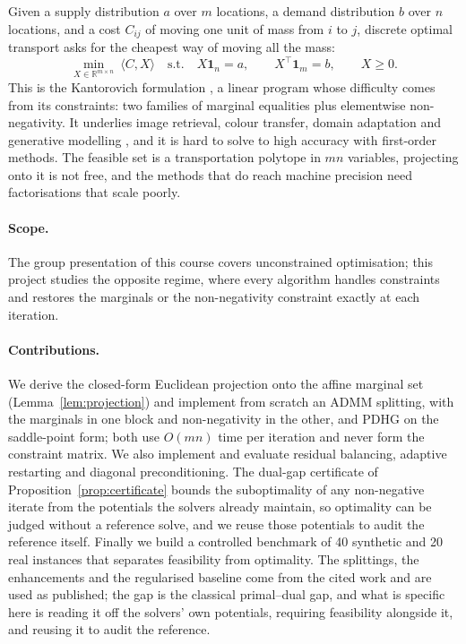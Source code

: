 \documentclass{article}
\newcommand{\R}{\mathbb{R}}
\begin{document}
Given a supply distribution $a$ over $m$ locations, a demand distribution $b$ over
$n$ locations, and a cost $C_{ij}$ of moving one unit of mass from $i$ to $j$,
discrete optimal transport asks for the cheapest way of moving all the mass:
\begin{equation}
\label{eq:ot}
\min_{X\in\R^{m\times n}}\ \langle C,X\rangle
\quad\text{s.t.}\quad
X\mathbf 1_n=a,\qquad X^\top\mathbf 1_m=b,\qquad X\ge 0 .
\end{equation}
This is the Kantorovich formulation \citep{kantorovich1942}, a linear program whose
difficulty comes from its constraints: two families of marginal equalities plus
elementwise non-negativity. It underlies image retrieval, colour transfer, domain
adaptation and generative modelling \citep{peyre2019}, and it is hard to solve to high
accuracy with first-order methods. The feasible set is a transportation polytope in $mn$
variables, projecting onto it is not free, and the methods that do reach machine
precision need factorisations that scale poorly.

\paragraph{Scope.}
The group presentation of this course covers unconstrained optimisation; this project studies
the opposite regime, where every algorithm handles constraints and restores the marginals or
the non-negativity constraint exactly at each iteration.

\paragraph{Contributions.}
We derive the closed-form Euclidean projection onto the affine marginal set
(Lemma~\ref{lem:projection}) and implement from scratch an ADMM splitting, with the
marginals in one block and non-negativity in the other, and PDHG on the saddle-point
form; both use $O(mn)$ time per iteration and never form the constraint matrix. We also
implement and evaluate residual balancing, adaptive restarting and diagonal
preconditioning. The dual-gap certificate of Proposition~\ref{prop:certificate} bounds
the suboptimality of any non-negative iterate from the potentials the solvers already
maintain, so optimality can be judged without a reference solve, and we reuse those
potentials to audit the reference itself. Finally we build a controlled benchmark of 40
synthetic and 20 real instances that separates feasibility from optimality. The
splittings, the enhancements and the regularised baseline come from the cited work and
are used as published; the gap is the classical primal--dual gap, and what is specific
here is reading it off the solvers' own potentials, requiring feasibility alongside it,
and reusing it to audit the reference.
\end{document}
